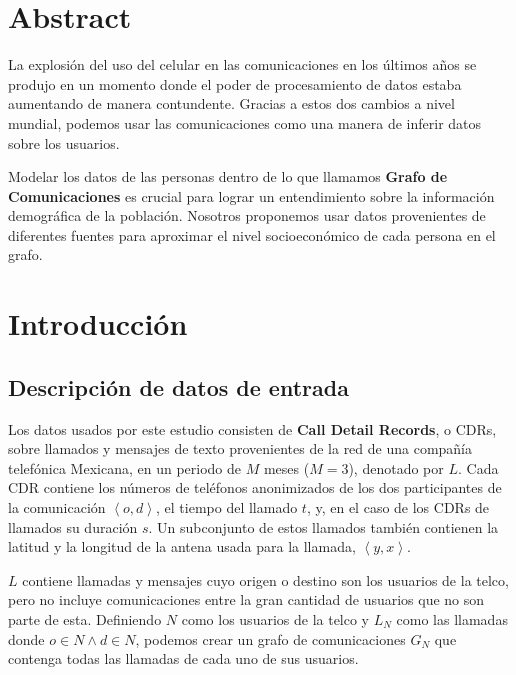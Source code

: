 \documentclass[
11pt,
spanish,
singlespacing, %
parskip, %
headsepline, %
]{MastersDoctoralThesis} %
\begin{document}
\section*{Abstract}

La explosi\'on del uso del celular en las comunicaciones en los \'ultimos a\~nos se produjo en un momento donde el poder de procesamiento de datos estaba aumentando de manera contundente. Gracias a estos dos cambios a nivel mundial, podemos usar las comunicaciones como una manera de inferir datos sobre los usuarios.

Modelar los datos de las personas dentro de lo que llamamos \textbf{Grafo de Comunicaciones} es crucial para lograr un entendimiento sobre la informaci\'on demogr\'afica de la poblaci\'on. Nosotros proponemos usar datos provenientes de diferentes fuentes para aproximar el nivel socioecon\'omico de cada persona en el grafo.

\section*{Introducci\'on}


\subsection*{Descripci\'on de datos de entrada}

Los datos usados por este estudio consisten de \textbf{Call Detail Records}, o CDRs, sobre llamados y mensajes de texto provenientes de la red de una compa\~n\'ia telef\'onica Mexicana, en un periodo de \( M \) meses (\( M = 3 \)), denotado por \( L \). Cada CDR contiene los n\'umeros de tel\'efonos anonimizados de los dos participantes de la comunicaci\'on \(\left<o, d\right>\), el tiempo del llamado \(t\), y, en el caso de los CDRs de llamados su duraci\'on \(s\). Un subconjunto de estos llamados tambi\'en contienen la latitud y la longitud de la antena usada para la llamada, \(\left<y, x\right>\).

\( L \) contiene llamadas y mensajes cuyo origen o destino son los usuarios de la telco, pero no incluye comunicaciones entre la gran cantidad de usuarios que no son parte de esta. Definiendo \( N \) como los usuarios de la telco y \( L_N \) como las llamadas donde \( o \in N \wedge d \in N \), podemos crear un grafo de comunicaciones \( G_N \) que contenga todas las llamadas de cada uno de sus usuarios.
\end{document}
